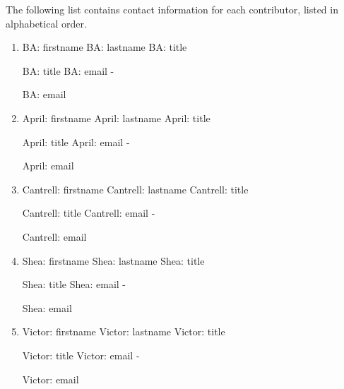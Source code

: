 \documentclass[11pt]{article}
\newcommand{\printcontributor}[1]{
  \begingroup
  \parindent 0pt
  \usevalue #1: firstname
  \space
  \usevalue #1: lastname
  \ifattribute #1: title {\par}{\relax}
  \usevalue #1: title
  \ifattribute #1: email {\space-\space} {\par\relax}
  \usevalue #1: email
  \endgroup
}
\begin{document}
\noindent The following list contains contact information for each contributor, listed in alphabetical order.

\begingroup
\parindent 0pt
\parskip  0pt

\begin{enumerate}

\item
\printcontributor{BA}

\item
\printcontributor{April}

\item 
\printcontributor{Cantrell}

\item
\printcontributor{Shea}

\item 
\printcontributor{Victor}

\end{enumerate}

\endgroup
\end{document}
